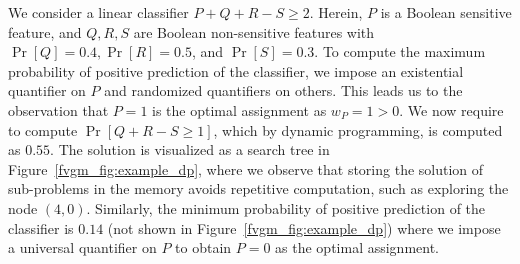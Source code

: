 \begin{example}\label{fvgm_example:subset-sum}
\normalfont
We consider a linear classifier $ P + Q + R - S \ge 2$. Herein, $ P $ is a Boolean sensitive feature, and $ Q, R, S $ are Boolean non-sensitive features with $ \Pr[Q] = 0.4,  \Pr[R] = 0.5 $, and $ \Pr[S] = 0.3 $. To compute the maximum probability of positive prediction of the classifier,  we impose an existential quantifier on $P$ and randomized quantifiers on others. This leads us to the observation that $ P = 1 $ is the optimal assignment as $ w_P = 1 > 0 $. We now require to compute $ \Pr[Q + R - S \ge 1] $, which by dynamic programming, is computed as $ 0.55 $. The solution is visualized as a search tree in Figure~\ref{fvgm_fig:example_dp}, where we observe that storing the solution of sub-problems in the memory avoids repetitive computation, such as exploring the node $ (4,0) $. Similarly, the minimum probability of positive prediction  of the classifier is $ 0.14 $ (not shown in Figure~\ref{fvgm_fig:example_dp}) where we impose a universal quantifier on $P$ to obtain $ P = 0 $ as the optimal assignment. 
\end{example}

	
	